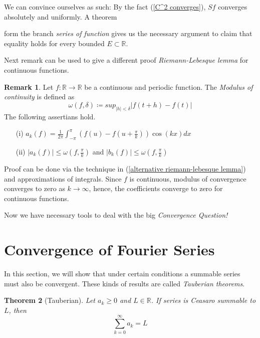 \documentclass[12pt]{amsart}
\newtheorem{theorem}{Theorem}[section]
\theoremstyle{definition}
\newtheorem{remark}[theorem]{Remark}
\newcommand{\RR}{{\mathbb R}} %
\begin{document}
    We can convince ourselves as such: By the fact (\ref{C^2 converges}), $Sf$ converges absolutely and uniformly. A theorem\footnotemark{}


    form the branch \emph{series of function} gives us the necessary argument to claim that equality holds for every bounded $E \subset \RR$.




Next remark can be used to give a different proof \emph{Riemann-Lebesque lemma} for continuous functions.


\begin{remark}
    Let $f: \RR \to \RR$ be a continuous and periodic function. The \emph{Modulus of continuity} is defined as
    \[
    \omega(f, \delta) \coloneqq sup_{|h| < \delta}|f(t+h) - f(t)|
    \] The following assertians hold.
    \begin{itemize}
        \item[(i)] $a_k(f) = \frac{1}{2\pi}  \int_{-\pi}^{\pi} (f(u) - f(u + \frac{\pi}{k}))\cos(kx)dx$
        \item[(ii)] $|a_k(f)| \leq \omega(f, \frac{\pi}{k})$ and $|b_k(f)| \leq \omega(f, \frac{\pi}{k})$
    \end{itemize}
\end{remark}


Proof can be done via the technique in (\ref{alternative riemann-lebesque lemma}) and approximations of integrals. Since $f$ is continuous, modulus of convergence converges to zero as $k \to \infty$, hence, the coefficients converge to zero for continuous functions.


\par Now we have necessary tools to deal with the big \emph{Convergence Question!}



\section{Convergence of Fourier Series}


In this section, we will show that under certain conditions a summable series must also be convergent. These kinds of results are called \emph{Tauberian theorems}.


\begin{theorem}[Tauberian]
    Let $a_k \geq 0$ and $L \in \RR$. If series is Ceasaro summable to $L$, then
    \[
    \sum_{k=0}^{\infty} a_k = L
    \]
\end{theorem}
\end{document}
